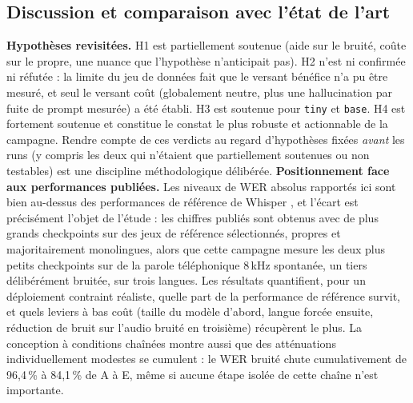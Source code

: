 \documentclass[12pt]{report}
\begin{document}
\subsection{Discussion et comparaison avec l'état de l'art}
\textbf{Hypothèses revisitées.} H1 est partiellement soutenue (aide sur le bruité, coûte sur le propre, une nuance que l'hypothèse n'anticipait pas). H2 n'est ni confirmée ni réfutée : la limite du jeu de données fait que le versant bénéfice n'a pu être mesuré, et seul le versant coût (globalement neutre, plus une hallucination par fuite de prompt mesurée) a été établi. H3 est soutenue pour \texttt{tiny} et \texttt{base}. H4 est fortement soutenue et constitue le constat le plus robuste et actionnable de la campagne. Rendre compte de ces verdicts au regard d'hypothèses fixées \emph{avant} les runs (y compris les deux qui n'étaient que partiellement soutenues ou non testables) est une discipline méthodologique délibérée.
\textbf{Positionnement face aux performances publiées.} Les niveaux de WER absolus rapportés ici sont bien au-dessus des performances de référence de Whisper \cite{radford2023robust}, et l'écart est précisément l'objet de l'étude : les chiffres publiés sont obtenus avec de plus grands checkpoints sur des jeux de référence sélectionnés, propres et majoritairement monolingues, alors que cette campagne mesure les deux plus petits checkpoints sur de la parole téléphonique 8\,kHz spontanée, un tiers délibérément bruitée, sur trois langues. Les résultats quantifient, pour un déploiement contraint réaliste, quelle part de la performance de référence survit, et quels leviers à bas coût (taille du modèle d'abord, langue forcée ensuite, réduction de bruit sur l'audio bruité en troisième) récupèrent le plus. La conception à conditions chaînées montre aussi que des atténuations individuellement modestes se cumulent : le WER bruité chute cumulativement de 96,4\,\% à 84,1\,\% de A à E, même si aucune étape isolée de cette chaîne n'est importante.
\end{document}
